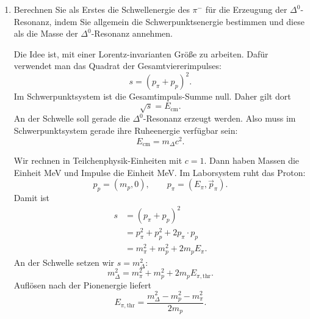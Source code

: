 \documentclass[11pt,a4paper]{scrartcl}
\begin{document}
    \begin{enumerate}[label=(\alph*)]
        \item
            Berechnen Sie als Erstes die Schwellenergie des $\pi^-$ für die Erzeugung der
            $\Delta^0$-Resonanz, indem Sie allgemein die Schwerpunktsenergie bestimmen
            und diese als die Masse der $\Delta^0$-Resonanz annehmen.

            \begin{calculationbox}
                Die Idee ist, mit einer Lorentz-invarianten Größe zu arbeiten. Dafür verwendet
                man das Quadrat der Gesamtviererimpulses:
                \[
                    s = (p_{\pi}+p_p)^2.
                \]
                Im Schwerpunktsystem ist die Gesamtimpuls-Summe null. Daher gilt dort
                \[
                    \sqrt{s}=E_{\mathrm{cm}}.
                \]
                An der Schwelle soll gerade die $\Delta^0$-Resonanz erzeugt werden. Also muss
                im Schwerpunktsystem gerade ihre Ruheenergie verfügbar sein:
                \[
                    E_{\mathrm{cm}}=m_{\Delta}c^2.
                \]

                \begin{calculationbox}
                    Wir rechnen in Teilchenphysik-Einheiten mit $c=1$. Dann haben Massen die
                    Einheit MeV und Impulse die Einheit MeV. Im Laborsystem ruht das Proton:
                    \[
                        p_p=(m_p,0),
                        \qquad
                        p_{\pi}=(E_{\pi},\vec p_{\pi}).
                    \]
                    Damit ist
                    \begin{align*}
                        s
                        &= (p_{\pi}+p_p)^2\\
                        &= p_{\pi}^2+p_p^2+2p_{\pi}\cdot p_p\\
                        &= m_{\pi}^2+m_p^2+2m_pE_{\pi}.
                    \end{align*}
                    An der Schwelle setzen wir $s=m_{\Delta}^2$:
                    \[
                        m_{\Delta}^2=m_{\pi}^2+m_p^2+2m_pE_{\pi,\mathrm{thr}}.
                    \]
                    Auflösen nach der Pionenergie liefert
                    \[
                        E_{\pi,\mathrm{thr}}
                        =\frac{m_{\Delta}^2-m_p^2-m_{\pi}^2}{2m_p}.
                    \]
                \end{calculationbox}


\end{calculationbox}
\end{enumerate}
\end{document}
